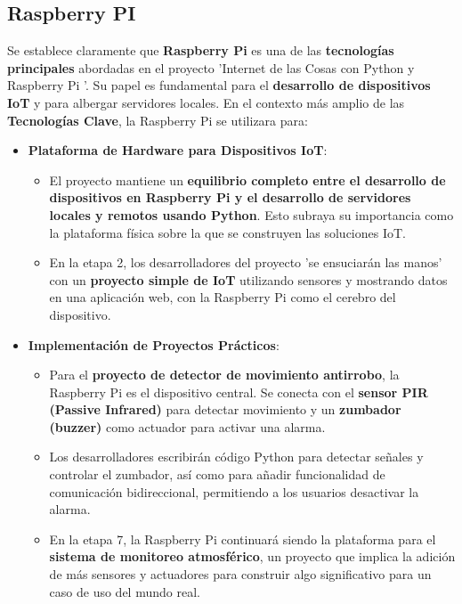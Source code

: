 \documentclass{report}
\begin{document}
\subsection{Raspberry PI}
Se establece claramente que \textbf{Raspberry Pi} \cite{raspberrypi} es una de las \textbf{tecnologías principales} 
abordadas en el proyecto  'Internet de las Cosas con Python y Raspberry Pi '. Su papel es fundamental para el \textbf{desarrollo 
de dispositivos IoT} y para albergar servidores locales. En el contexto más amplio de las \textbf{Tecnologías Clave}, la Raspberry Pi 
se utilizara para:
\begin{itemize}
    \item \textbf{Plataforma de Hardware para Dispositivos IoT}:
    \begin{itemize}
        \item El proyecto mantiene un \textbf{equilibrio completo entre el desarrollo de dispositivos en Raspberry Pi y el desarrollo 
        de servidores locales y remotos usando Python}. Esto subraya su importancia como la plataforma física sobre la que se construyen 
        las soluciones IoT.
        \item En la etapa 2, los desarrolladores del proyecto 'se ensuciarán las manos' con un \textbf{proyecto simple de IoT} utilizando 
        sensores y mostrando datos en una aplicación web, con la Raspberry Pi como el cerebro del dispositivo.
    \end{itemize}

    \item \textbf{Implementación de Proyectos Prácticos}:
    \begin{itemize}
        \item Para el \textbf{proyecto de detector de movimiento antirrobo}, la Raspberry Pi es el dispositivo central. Se conecta con el 
        \textbf{sensor PIR (Passive Infrared)} para detectar movimiento y un \textbf{zumbador (buzzer)} como actuador para activar una alarma.
        \item Los desarrolladores escribirán código Python para detectar señales y controlar el zumbador, así como para añadir funcionalidad 
        de comunicación bidireccional, permitiendo a los usuarios desactivar la alarma.
        \item En la etapa 7, la Raspberry Pi continuará siendo la plataforma para el \textbf{sistema de monitoreo atmosférico}, 
        un proyecto que implica la adición de más sensores y actuadores para construir algo significativo para un caso de uso del mundo real.
    \end{itemize}


\end{itemize}
\end{document}
